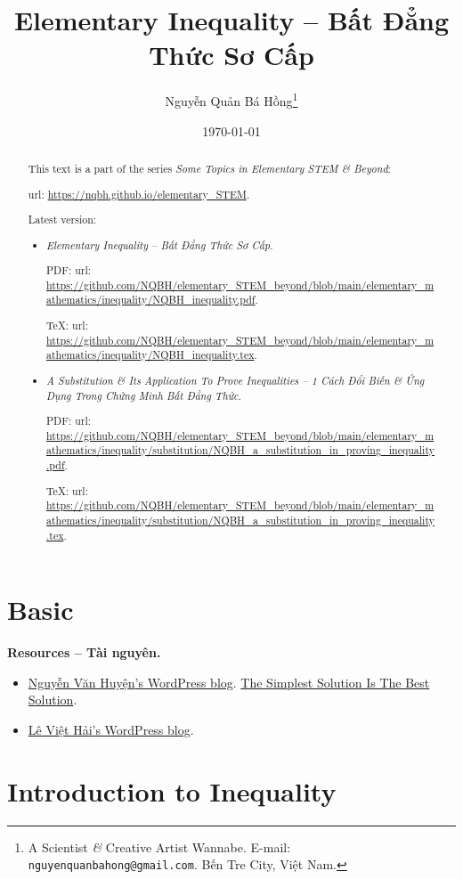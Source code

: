 \documentclass{article}
\title{Elementary Inequality -- Bất Đẳng Thức Sơ Cấp}
\author{Nguyễn Quản Bá Hồng\footnote{A Scientist {\it\&} Creative Artist Wannabe. E-mail: {\tt nguyenquanbahong@gmail.com}. Bến Tre City, Việt Nam.}}
\date{\today}
\begin{document}
\maketitle
\begin{abstract}
	This text is a part of the series {\it Some Topics in Elementary STEM \& Beyond}:
	
	{\sc url}: \url{https://nqbh.github.io/elementary_STEM}.
	
	Latest version:
	\begin{itemize}
		\item {\it Elementary Inequality -- Bất Đẳng Thức Sơ Cấp}.
		
		PDF: {\sc url}: \url{https://github.com/NQBH/elementary_STEM_beyond/blob/main/elementary_mathematics/inequality/NQBH_inequality.pdf}.
		
		\TeX: {\sc url}: \url{https://github.com/NQBH/elementary_STEM_beyond/blob/main/elementary_mathematics/inequality/NQBH_inequality.tex}.
		\item {\it A Substitution \& Its Application To Prove Inequalities -- 1 Cách Đổi Biến \& Ứng Dụng Trong Chứng Minh Bất Đẳng Thức}.
		
		PDF: {\sc url}: \url{https://github.com/NQBH/elementary_STEM_beyond/blob/main/elementary_mathematics/inequality/substitution/NQBH_a_substitution_in_proving_inequality.pdf}.
		
		\TeX: {\sc url}: \url{https://github.com/NQBH/elementary_STEM_beyond/blob/main/elementary_mathematics/inequality/substitution/NQBH_a_substitution_in_proving_inequality.tex}.
	\end{itemize}
\end{abstract}
\tableofcontents


\section{Basic}
\textbf{\textsf{Resources -- Tài nguyên.}}
\begin{itemize}
	\item \href{https://nguyenhuyenag.wordpress.com/}{{\sc Nguyễn Văn Huyện}'s WordPress blog}. \href{https://mathifc.wordpress.com/}{The Simplest Solution Is The Best Solution}.
	\item \href{https://leviethai.wordpress.com}{{\sc Lê Việt Hải}'s WordPress blog}.
\end{itemize}

\section{Introduction to Inequality}
\end{document}
